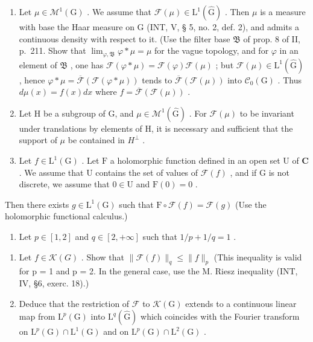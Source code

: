 \begin{enumerate}
\def\labelenumi{\arabic{enumi})}
\setcounter{enumi}{4}
\item
  Let \(\mu \in \mathcal{M}^1 (\mathrm{G})\) . We assume that \(\mathcal{F}(\mu)\in \mathrm{L}^1 (\widehat{\mathrm{G}})\) . Then \(\mu\) is a measure with base the Haar measure on G (INT, V, § 5, no. 2, def. 2), and admits a continuous density with respect to it. (Use the filter base \(\mathfrak{B}\) of prop. 8 of II, p.~211. Show that \(\lim_{\varphi ,\mathfrak{B}}\varphi *\mu = \mu\) for the vague topology, and for \(\varphi\) in an element of \(\mathfrak{B}\) , one has \(\mathcal{F}(\varphi *\mu) = \mathcal{F}(\varphi)\mathcal{F}(\mu)\) ; but \(\mathcal{F}(\mu)\in \mathrm{L}^1 (\widehat{\mathrm{G}})\) , hence \(\varphi *\mu = \overline{\mathcal{F}} (\mathcal{F}(\varphi *\mu))\) tends to \(\overline{\mathcal{F}} (\mathcal{F}(\mu))\) into \(\mathcal{C}_0(\mathrm{G})\) . Thus \(d\mu (x) = f(x)dx\) where \(f = \overline{\mathcal{F}} (\mathcal{F}(\mu))\) .
\item
  Let H be a subgroup of G, and \(\mu \in \mathcal{M}^{1}(\widehat{\mathrm{G}})\) . For \(\mathcal{F}(\mu)\) to be invariant under translations by elements of H, it is necessary and sufficient that the support of \(\mu\) be contained in \(H^{\perp}\) .
\item
  Let \(f \in \mathrm{L}^1(\mathrm{G})\) . Let \(\mathrm{F}\) a holomorphic function defined in an open set \(\mathrm{U}\) of \(\mathbf{C}\) . We assume that \(\mathrm{U}\) contains the set of values of \(\mathcal{F}(f)\) , and if \(\mathrm{G}\) is not discrete, we assume that \(0 \in \mathrm{U}\) and \(\mathrm{F}(0) = 0\) .
\end{enumerate}

Then there exists \(g \in \mathrm{L}^{1}(\mathrm{G})\) such that \(\mathrm{F} \circ \mathcal{F}(f) = \mathcal{F}(g)\) (Use the holomorphic functional calculus.)

\begin{enumerate}
\def\labelenumi{\arabic{enumi})}
\setcounter{enumi}{7}
\tightlist
\item
  Let \(p \in [1,2]\) and \(q \in [2, +\infty]\) such that \(1/p + 1/q = 1\) .
\end{enumerate}

\begin{enumerate}
\def\labelenumi{\alph{enumi})}
\item
  Let \(f \in \mathcal{K}(G)\) . Show that \(\|\mathcal{F}(f)\|_{q} \leqslant \|f\|_{p}\) (This inequality is valid for p = 1 and p = 2. In the general case, use the M. Riesz inequality (INT, IV, §6, exerc. 18).)
\item
  Deduce that the restriction of \(\mathcal{F}\) to \(\mathcal{K}(\mathrm{G})\) extends to a continuous linear map from \(\mathrm{L}^p (\mathrm{G})\) into \(\mathrm{L}^q (\widehat{\mathrm{G}})\) which coincides with the Fourier transform on \(\mathrm{L}^p (\mathrm{G})\cap \mathrm{L}^1 (\mathrm{G})\) and on \(\mathrm{L}^p (\mathrm{G})\cap \mathrm{L}^2 (\mathrm{G})\) .
\end{enumerate}

